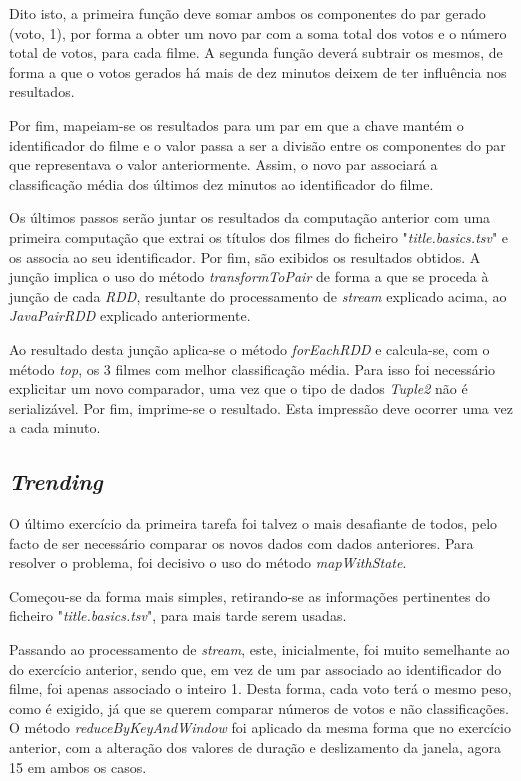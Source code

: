 \documentclass[a4paper]{report}
\begin{document}
            Dito isto, a primeira função deve somar ambos os componentes do par gerado (voto, 1), por forma a obter um novo par com a soma total dos votos e o número total de votos, para cada filme.
            A segunda função deverá subtrair os mesmos, de forma a que o votos gerados há mais de dez minutos deixem de ter influência nos resultados.
            
            Por fim, mapeiam-se os resultados para um par em que a chave mantém o identificador do filme e o valor passa a ser a divisão entre os componentes do par que representava o valor anteriormente.
            Assim, o novo par associará a classificação média dos últimos dez minutos ao identificador do filme.

            Os últimos passos serão juntar os resultados da computação anterior com uma primeira computação que extrai os títulos dos filmes do ficheiro "\textit{title.basics.tsv}" \hspace{0.1mm} e os associa ao seu identificador. Por fim, são exibidos os resultados obtidos.
            A junção implica o uso do método \textit{transformToPair} de forma a que se proceda à junção de cada \textit{RDD}, resultante do processamento de \textit{stream} explicado acima, ao \textit{JavaPairRDD} explicado anteriormente.

            Ao resultado desta junção aplica-se o método \textit{forEachRDD} e calcula-se, com o método \textit{top}, os 3 filmes com melhor classificação média.
            Para isso foi necessário explicitar um novo comparador, uma vez que o tipo de dados \textit{Tuple2} não é serializável.
            Por fim, imprime-se o resultado. Esta impressão deve ocorrer uma vez a cada minuto.

        \subsection{\textit{Trending}} \label{subsec:Task1-Trending}
            O último exercício da primeira tarefa foi talvez o mais desafiante de todos, pelo facto de ser necessário comparar os novos dados com dados anteriores.
            Para resolver o problema, foi decisivo o uso do método \textit{mapWithState}.

            Começou-se da forma mais simples, retirando-se as informações pertinentes do ficheiro "\textsl{title.basics.tsv}", para mais tarde serem usadas.

            Passando ao processamento de \textit{stream}, este, inicialmente, foi muito semelhante ao do exercício anterior, sendo que, em vez de um par associado ao identificador do filme, foi apenas associado o inteiro 1.
            Desta forma, cada voto terá o mesmo peso, como é exigido, já que se querem comparar números de votos e não classificações.
            O método \textit{reduceByKeyAndWindow} foi aplicado da mesma forma que no exercício anterior, com a alteração dos valores de duração e deslizamento da janela, agora 15 em ambos os casos.
\end{document}

